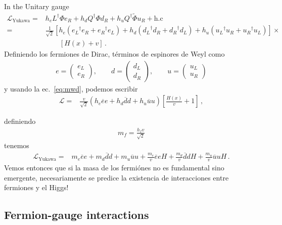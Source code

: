 \begin{frame}
In the Unitary gauge
\begin{align}
  \mathcal{L}_{\text{Yukawa}}=&h_e L^{\dagger}\Phi e_R+h_d Q^{\dagger}\Phi d_R+h_u Q^{\dagger}\widetilde{\Phi}u_R+\text{h.c}\nonumber\\
=&\frac{1}{\sqrt{2}}\left[h_e({e_L}^{\dagger}e_R+{e_R}^{\dagger}e_L)+
h_d({d_L}^{\dagger}d_R+{d_R}^{\dagger}d_L)
+h_u({u_L}^{\dagger}u_R+{u_R}^{\dagger}u_L)\right]\times\nonumber\\
&\qquad\left[H(x)+v\right]\,.
\end{align}
Definiendo los fermiones de Dirac, términos de espinores de Weyl como
\begin{align}
  e=
  \begin{pmatrix}
    e_L\\
    e_R
  \end{pmatrix},\qquad d=
  \begin{pmatrix}
    d_L\\
    d_R
  \end{pmatrix},\qquad u=
  \begin{pmatrix}
    u_L\\
    u_R
  \end{pmatrix}
\end{align}
y usando la ec.~\eqref{eq:mwd}, podemos escribir
\begin{align*}
\mathcal{L}=&\frac{v}{\sqrt{2}}\left(h_e\overline{e}e+h_d\overline{d}d
+h_u\overline{u}u\right)
\left[\frac{H(x)}{v}+1\right]\,,
\end{align*}

definiendo
\begin{align}
  m_f=\frac{h_fv}{\sqrt{2}}
\end{align}
tenemos
\begin{align}
\label{eq:lyukfin}
 \mathcal{L}_{\text{Yukawa}}=&m_e\overline{e}e+m_d\overline{d}d
+m_u\overline{u}u+
  \frac{m_e}{v}\overline{e}e H+\frac{m_d}{v}\overline{d}d H
+\frac{m_u}{v}\overline{u}u H\,.
\end{align}
Vemos entonces que si la masa de los fermiónes no es fundamental sino
emergente, necesariamente se predice la existencia de interacciones
entre fermiones y el Higgs!

\end{frame}
\subsection{Fermion-gauge interactions}

